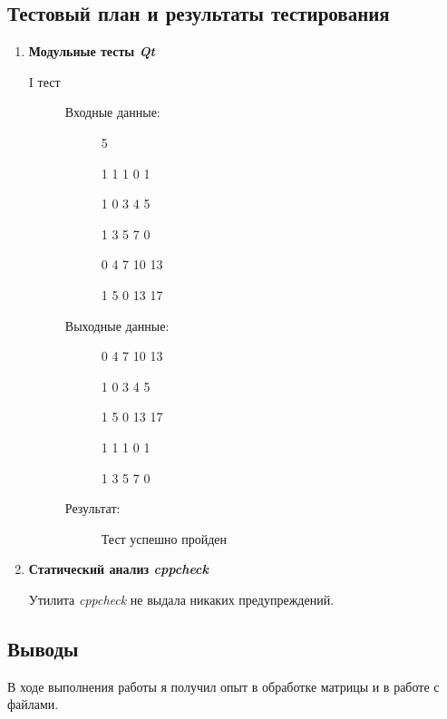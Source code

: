 \documentclass[12pt,a4paper]{report}
\begin{document}
\subsection{Тестовый план и результаты тестирования}
\hspace{\parindent}
\begin{enumerate}
\item \textbf{Модульные тесты \textit{Qt}}

\begin{description}
\item[I тест]
\hspace{\parindent}
\begin{flushleft}
\begin{description}
\item[Входные данные:]

\hspace{\parindent}
\begin{flushleft}
5

1 1 1 0 1

1 0 3 4 5

1 3 5 7 0

0 4 7 10 13

1 5 0 13 17
\end{flushleft}

\item[Выходные данные:]
\hspace{\parindent}
\begin{flushleft}
0 4 7 10 13

1 0 3 4 5

1 5 0 13 17

1 1 1 0 1

1 3 5 7 0
\end{flushleft}
\item[Результат:] Тест успешно пройден
\end{description}
\end{flushleft}
\end{description}

\item \textbf{Статический анализ \textit{cppcheck}}

Утилита \textit{cppcheck} не выдала никаких предупреждений.
\end{enumerate}
\subsection{Выводы}
\hspace{\parindent}
В ходе выполнения работы я получил опыт в обработке матрицы и в работе с файлами.
\end{document}

